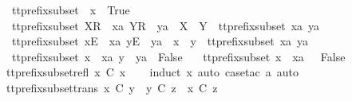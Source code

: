 \begin{isabellebody}
\ \ {\isachardoublequoteopen}tt{\isacharunderscore}prefix{\isacharunderscore}subset\ {\isacharbrackleft}{\isacharbrackright}\ x\ {\isacharequal}\ True{\isachardoublequoteclose}\ {\isacharbar}\isanewline
\ \ {\isachardoublequoteopen}tt{\isacharunderscore}prefix{\isacharunderscore}subset\ {\isacharparenleft}{\isacharbrackleft}X{\isacharbrackright}\isactrlsub R\ {\isacharhash}\ xa{\isacharparenright}\ {\isacharparenleft}{\isacharbrackleft}Y{\isacharbrackright}\isactrlsub R\ {\isacharhash}\ ya{\isacharparenright}\ {\isacharequal}\ {\isacharparenleft}X\ {\isasymsubseteq}\ Y\ {\isasymand}\ tt{\isacharunderscore}prefix{\isacharunderscore}subset\ xa\ ya{\isacharparenright}{\isachardoublequoteclose}\ {\isacharbar}\isanewline
\ \ {\isachardoublequoteopen}tt{\isacharunderscore}prefix{\isacharunderscore}subset\ {\isacharparenleft}{\isacharbrackleft}x{\isacharbrackright}\isactrlsub E\ {\isacharhash}\ xa{\isacharparenright}\ {\isacharparenleft}{\isacharbrackleft}y{\isacharbrackright}\isactrlsub E\ {\isacharhash}\ ya{\isacharparenright}\ {\isacharequal}\ {\isacharparenleft}x\ {\isacharequal}\ y\ {\isasymand}\ tt{\isacharunderscore}prefix{\isacharunderscore}subset\ xa\ ya{\isacharparenright}{\isachardoublequoteclose}\ {\isacharbar}\isanewline
\ \ {\isachardoublequoteopen}tt{\isacharunderscore}prefix{\isacharunderscore}subset\ {\isacharparenleft}x\ {\isacharhash}\ xa{\isacharparenright}\ {\isacharparenleft}y\ {\isacharhash}\ ya{\isacharparenright}\ {\isacharequal}\ False{\isachardoublequoteclose}\ {\isacharbar}\isanewline
\ \ {\isachardoublequoteopen}tt{\isacharunderscore}prefix{\isacharunderscore}subset\ {\isacharparenleft}x\ {\isacharhash}\ xa{\isacharparenright}\ {\isacharbrackleft}{\isacharbrackright}\ {\isacharequal}\ False{\isachardoublequoteclose}\isanewline
\isanewline
{}\isamarkupfalse%
\ tt{\isacharunderscore}prefix{\isacharunderscore}subset{\isacharunderscore}refl{\isacharcolon}\ {\isachardoublequoteopen}x\ {\isasymlesssim}\isactrlsub C\ x{\isachardoublequoteclose}\isanewline
%
\isadelimproof
\ \ %
\endisadelimproof
%
\isatagproof
{}\isamarkupfalse%
\ {\isacharparenleft}induct\ x{\isacharcomma}\ auto{\isacharcomma}\ case{\isacharunderscore}tac\ a{\isacharcomma}\ auto{\isacharparenright}%
\endisatagproof
{\isafoldproof}%
%
\isadelimproof
\isanewline
%
\endisadelimproof
\isanewline
{}\isamarkupfalse%
\ tt{\isacharunderscore}prefix{\isacharunderscore}subset{\isacharunderscore}trans{\isacharcolon}\ {\isachardoublequoteopen}x\ {\isasymlesssim}\isactrlsub C\ y\ {\isasymLongrightarrow}\ y\ {\isasymlesssim}\isactrlsub C\ z\ {\isasymLongrightarrow}\ x\ {\isasymlesssim}\isactrlsub C\ z{\isachardoublequoteclose}\isanewline

\end{isabellebody}
